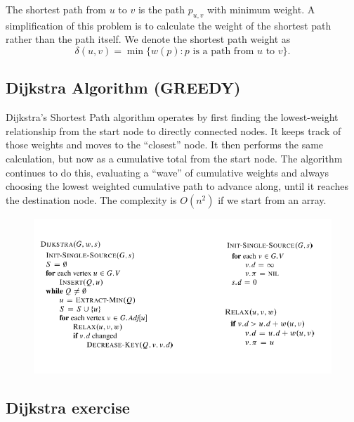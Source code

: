 The shortest path from \( u \) to \( v \) is the path \( p_{u,v} \) with minimum weight. A simplification of this problem is to calculate the weight of the shortest path rather than the path itself. We denote the shortest path weight as  
\[ \delta(u, v) = \min \{ w(p) : p \text{ is a path from } u \text{ to } v \}. \]

\subsection{Dijkstra Algorithm (GREEDY)}
Dijkstra’s Shortest Path algorithm operates by first finding the lowest-weight relationship from the start node to directly connected nodes. It keeps track of those weights and moves to the “closest” node.  It then performs the same calculation, but now as a cumulative total from the start node. The algorithm continues to do this, evaluating a “wave” of cumulative weights and always choosing the lowest weighted cumulative path to advance along, until it reaches the destination node.
\newline
The complexity is $O(n^2)$ if we start from an array.

\begin{figure}[H]
    \centering
    \includegraphics[width=0.75\linewidth]{dijkstra algorithm .png}
\end{figure}
\subsection{Dijkstra exercise}
